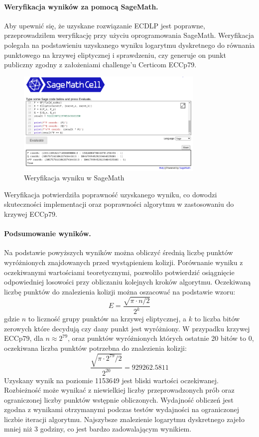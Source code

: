 \paragraph{Weryfikacja wyników za pomocą SageMath.}
Aby upewnić się, że uzyskane rozwiązanie ECDLP jest poprawne, przeprowadziłem
weryfikację przy użyciu oprogramowania SageMath. Weryfikacja polegała na
podstawieniu uzyskanego wyniku logarytmu dyskretnego do równania punktowego
na krzywej eliptycznej i sprawdzeniu, czy generuje on punkt publiczny
zgodny z założeniami challenge'u Certicom ECCp79.
\begin{figure}[H]
    \centering
    \includegraphics[width=0.8\textwidth]{img/sage_check_full.png}
    \caption{Weryfikacja wyniku w SageMath}
    \label{fig:sage_verification}
\end{figure}

Weryfikacja potwierdziła poprawność uzyskanego wyniku, co dowodzi skuteczności
implementacji oraz poprawności algorytmu w zastosowaniu do krzywej ECCp79.

\paragraph{Podsumowanie wyników.}
Na podstawie powyższych wyników można obliczyć średnią liczbę punktów wyróżnionych
znajdowanych przed wystąpieniem kolizji.
Porównanie wyniku z oczekiwanymi wartościami teoretycznymi, pozwoliło potwierdzić
osiągnięcie odpowiedniej losowości przy obliczaniu kolejnych kroków algorytmu.
Oczekiwaną liczbę punktów do znalezienia kolizji można oszacować na podstawie wzoru:
$$
    E = \frac{\sqrt{\pi \cdot n / 2}}{2^k}
$$
gdzie $n$ to liczność grupy punktów na krzywej eliptycznej, a $k$ to liczba bitów zerowych które decydują
czy dany punkt jest wyróżniony. W przypadku krzywej ECCp79,
dla $n \approx 2^{79}$, oraz punktów wyróżnionych których ostatnie 20 bitów to $0$, oczekiwana liczba
punktów potrzebna do znalezienia kolizji:
$$
    \frac{\sqrt{\pi \cdot 2^{79} / 2}}{2^{20}} = 929262.5811
$$
Uzyskany wynik na poziomie 1153649 jest bliski wartości oczekiwanej. Rozbieżność może wynikać z niewielkiej
liczby przeprowadzonych prób oraz ograniczonej liczby punktów wstępnie obliczonych.
Wydajność obliczeń jest zgodna z wynikami otrzymanymi podczas testów wydajności na ograniczonej liczbie iteracji algorytmu.
Najszybsze znalezienie logarytmu dyskretnego zajeło mniej niż 3 godziny, co jest bardzo zadowalającym wynikiem.

